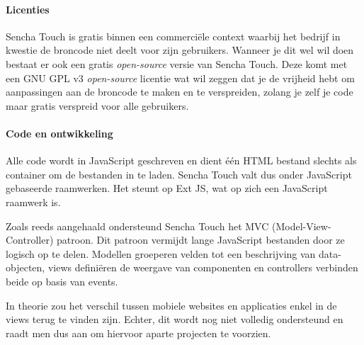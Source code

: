 \documentclass[a4paper]{article}
\newcommand{\term}[1]{\emph{#1}}
\newcommand{\code}[1]{\texttt{#1}}
\begin{document}
\paragraph{Licenties}
Sencha Touch is gratis binnen een commerciële context waarbij het bedrijf in kwestie de broncode niet deelt voor zijn gebruikers.  Wanneer je dit wel wil doen bestaat er ook een gratis \term{open-source} versie van Sencha Touch.  Deze komt met een GNU GPL v3 \term{open-source} licentie wat wil zeggen dat je de vrijheid hebt om aanpassingen aan de broncode te maken en te verspreiden,  zolang je zelf je code maar gratis verspreid voor alle gebruikers.
  

\paragraph{Code en ontwikkeling}
Alle code wordt in JavaScript geschreven en dient één HTML bestand slechts als container om de bestanden in te laden.  Sencha Touch valt dus onder JavaScript gebaseerde raamwerken.  Het steunt op Ext JS,  wat op zich een JavaScript raamwerk is.  

Zoals reeds aangehaald ondersteund Sencha Touch het MVC (Model-View-Controller) patroon.  Dit patroon vermijdt lange JavaScript bestanden door ze logisch op te delen.  Modellen groeperen velden tot een beschrijving van data-objecten,  views definiëren de weergave van componenten en controllers verbinden beide op basis van events.
 
In theorie zou het verschil tussen mobiele websites en applicaties enkel in de views terug te vinden zijn.  Echter,  dit wordt nog niet volledig ondersteund en raadt men dus aan om hiervoor aparte projecten te voorzien.

\end{document}
